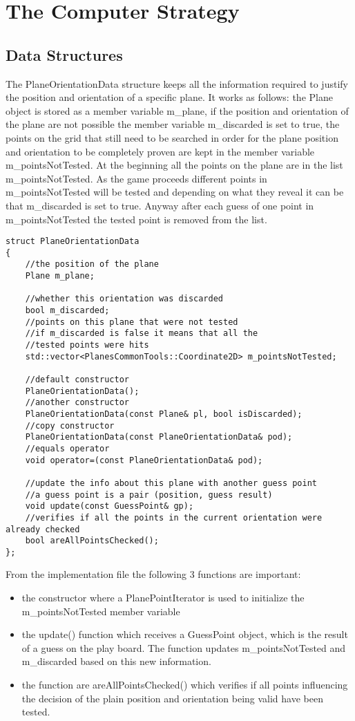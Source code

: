 \section{The Computer Strategy}

\subsection{Data Structures}

The PlaneOrientationData structure keeps all the information required to justify the position and orientation of a specific plane. It works as follows: the Plane object is stored as a member variable m\_plane, if the position and orientation of the plane are not possible the member variable m\_discarded is set to true, the points on the grid that still need to be searched in order for the plane position and orientation to be completely proven are kept in the member variable m\_pointsNotTested. At the beginning all the points on the plane are in the list m\_pointsNotTested. As the game proceeds different points in m\_pointsNotTested will be tested and depending on what they reveal it can be that m\_discarded is set to true. Anyway after each guess of one point in m\_pointsNotTested the tested point is removed from the list. 

\begin{lstlisting}
struct PlaneOrientationData
{
	//the position of the plane
	Plane m_plane;
	
	//whether this orientation was discarded
	bool m_discarded;
	//points on this plane that were not tested
	//if m_discarded is false it means that all the
	//tested points were hits
	std::vector<PlanesCommonTools::Coordinate2D> m_pointsNotTested;
	
	//default constructor
	PlaneOrientationData();
	//another constructor
	PlaneOrientationData(const Plane& pl, bool isDiscarded);
	//copy constructor
	PlaneOrientationData(const PlaneOrientationData& pod);
	//equals operator
	void operator=(const PlaneOrientationData& pod);
	
	//update the info about this plane with another guess point
	//a guess point is a pair (position, guess result)
	void update(const GuessPoint& gp);
	//verifies if all the points in the current orientation were already checked
	bool areAllPointsChecked();
};

\end{lstlisting}

From the implementation file the following 3 functions are important: \begin{itemize}
	\item the constructor where a PlanePointIterator is used to initialize the m\_pointsNotTested member variable
	\item the update() function which receives a GuessPoint object, which is the result of a guess on the play board. The function updates m\_pointsNotTested and m\_discarded based on this new information.
	\item the function are areAllPointsChecked() which verifies if all points influencing the decision of the plain position and orientation being valid have been tested.
\end{itemize}

